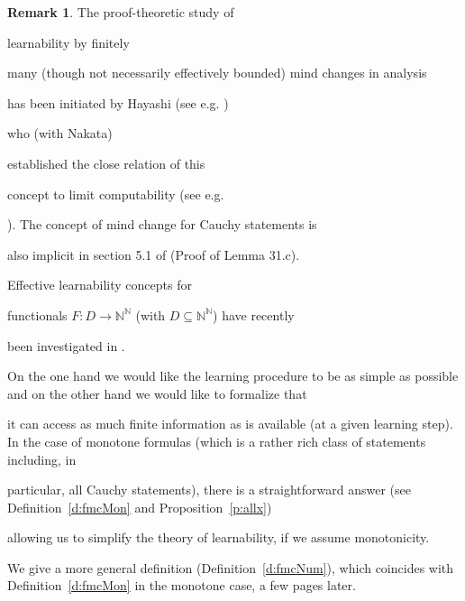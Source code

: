 \documentclass[1p]{elsarticle}
\newcommand{\NN}{\ensuremath{\mathbb{N}}}
\theoremstyle{plain}
\theoremstyle{definition}
\newtheorem{rmk}[thm]{Remark}
\theoremstyle{remark}
\theoremstyle{definition}
\begin{document}
\begin{rmk}

The proof-theoretic study of 

learnability by finitely 

many (though not necessarily effectively bounded) mind changes in analysis 

has been initiated by Hayashi (see e.g. \cite{Hayashi02,Hayashi06}) 

who (with Nakata) 

established the close relation of this 

concept to limit computability (see e.g. 

\cite{Hayashi/Nakata}). The concept of mind change for Cauchy statements is 

also implicit in section 5.1 of \cite{Ziegler(07)} (Proof of Lemma 31.c). 

Effective learnability concepts for 

functionals $F:D\to\NN^{\NN}$ (with $D\subseteq\NN^{\NN}$) have recently 

been investigated in \cite{Higuchi/Kihara}.

\end{rmk}

On the one hand we would like the learning procedure to be as simple as possible and on the other hand we would like to formalize that

it can access as much finite information as is available (at a given learning step). In the case of monotone formulas (which is a rather rich class of statements including, in 

particular, all Cauchy statements), there is a straightforward answer (see Definition~\ref{d:fmcMon} and Proposition~\ref{p:allx}) 

allowing us to simplify the theory of learnability, if we assume monotonicity.

We give a more general definition (Definition~\ref{d:fmcNum}), which coincides with Definition~\ref{d:fmcMon} in the monotone case, a few pages later.
\end{document}
